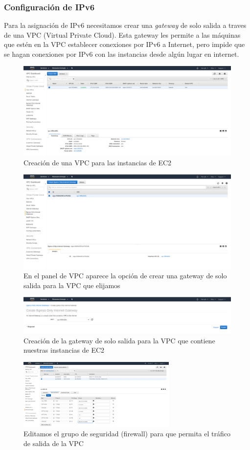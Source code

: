\documentclass[12pt]{article}
\begin{document}
\subsubsection{Configuración de IPv6}
Para la asignación de IPv6 necesitamos crear una \textit{gateway} de solo salida a traves de una \textsf{VPC} (Virtual Private Cloud). Esta gateway les permite a las máquinas que estén en la VPC establecer conexiones por IPv6 a Internet, pero impide que se hagan conexiones por IPv6 con las instancias desde algún lugar en internet.
\\
\begin{figure}[H]
  \centering
  \includegraphics[width=0.8\linewidth]{vpc}
  \caption{Creación de una VPC para las instancias de EC2}
\end{figure}
\begin{figure}
  \centering
  \includegraphics[width=0.8\linewidth]{vpc_egress_only}
  \caption{En el panel de VPC aparece la opción de crear una gateway de solo salida para la VPC que elijamos}
\end{figure}
\begin{figure}[H]
  \centering
  \includegraphics[width=0.8\linewidth]{egress_only_gateway}
  \caption{Creación de la gateway de solo salida para la VPC que contiene nuestras instancias de EC2}
\end{figure}
\begin{figure}[H]
  \centering
  \includegraphics[width=0.7\textwidth]{edit_security_group}
  \caption{Editamos el grupo de seguridad (firewall) para que permita el tráfico  de salida de la VPC}
\end{figure}
\end{document}
